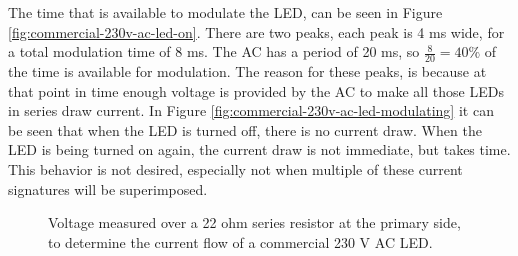 The time that is available to modulate the LED, can be seen in Figure \ref{fig:commercial-230v-ac-led-on}.
There are two peaks, each peak is 4 ms wide, for a total modulation time of 8 ms.
The AC has a period of 20 ms, so $\frac{8}{20} = 40 \%$ of the time is available for modulation.
The reason for these peaks, is because at that point in time enough voltage is provided by the AC to make all those LEDs in series draw current.
In Figure \ref{fig:commercial-230v-ac-led-modulating} it can be seen that when the LED is turned off, there is no current draw.
When the LED is being turned on again, the current draw is not immediate, but takes time.
This behavior is not desired, especially not when multiple of these current signatures will be superimposed.

\begin{figure}
	\centering     %

	\caption{Voltage measured over a 22 ohm series resistor at the primary side, to determine the current flow of a commercial 230 V AC LED.}
\end{figure}






